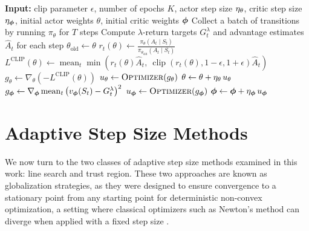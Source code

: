 \begin{algorithm}[htbp]
\caption{Proximal Policy Optimization (PPO)}
\label{alg:ppo}
\begin{algorithmic}[1]
\State \textbf{Input:} clip parameter $\epsilon$, number of epochs $K$, actor step size $\eta_\theta$, critic step size $\eta_{{\bm \phi}}$, initial actor weights $\theta$, initial critic weights ${\bm \phi}$
    \State Collect a batch of transitions by running $\pi_\theta$ for $T$ steps
    \State Compute $\lambda$-return targets $G_t^\lambda$ and advantage estimates $\hat{A}_t$ for each step
    \State $\theta_{\text{old}} \gets \theta$
            \State $r_t(\theta) \gets \frac{\pi_\theta(A_t \mid S_t)}{\pi_{\theta_{\text{old}}}(A_t \mid S_t)}$
            \State $L^{\text{CLIP}}(\theta) \gets \operatorname{mean}_t \min\!\left( r_t(\theta) \hat{A}_t,\ \operatorname{clip}(r_t(\theta), 1-\epsilon, 1+\epsilon)\hat{A}_t \right)$
            \State $g_\theta \gets \nabla_\theta \left( -L^{\text{CLIP}}(\theta) \right)$ 
            \State $\update_\theta \gets \textproc{Optimizer}(g_\theta)$ 
            \State $\theta \gets \theta + \eta_\theta\, u_\theta$
            \State $g_{{\bm \phi}} \gets \nabla_{{\bm \phi}} \operatorname{mean}_t \left( v_{\bm \phi}(S_t) - G_t^\lambda \right)^2$ 
            \State $\update_{\vparams} \gets \textproc{Optimizer}(g_{\vparams})$
            \State ${\bm \phi} \gets {\bm \phi} + \eta_{{\bm \phi}}\, u_{{\bm \phi}}$
        \EndFor
    \EndFor
\EndFor
\end{algorithmic}
\end{algorithm}


\FloatBarrier
\section{Adaptive Step Size Methods} \label{sec:adaptive}
We now turn to the two classes of adaptive step size methods examined in this work: line search and trust region. These two approaches are known as globalization strategies, as they were designed to ensure convergence to a stationary point from any starting point for deterministic non-convex optimization, a setting where classical optimizers such as Newton's method can diverge when applied with a fixed step size . 

